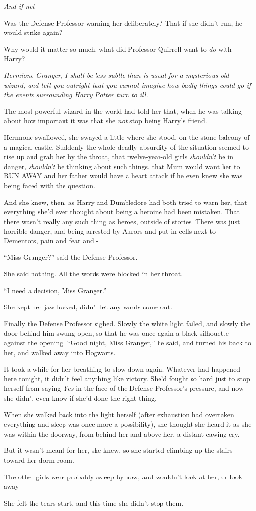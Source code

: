 \emph{And if not -}

Was the Defense Professor warning her deliberately? That if she didn't
run, he would strike again?

Why would it matter so much, what did Professor Quirrell want to
\emph{do} with Harry?

\emph{Hermione Granger, I shall be less subtle than is usual for a
mysterious old wizard, and tell you outright that you cannot}
\emph{imagine} \emph{how badly things could go if the events surrounding
Harry Potter turn to ill.}

The most powerful wizard in the world had told her that, when he was
talking about how important it was that she \emph{not} stop being
Harry's friend.

Hermione swallowed, she swayed a little where she stood, on the stone
balcony of a magical castle. Suddenly the whole deadly absurdity of the
situation seemed to rise up and grab her by the throat, that
twelve-year-old girls \emph{shouldn't} be in danger, \emph{shouldn't} be
thinking about such things, that Mum would want her to RUN AWAY and her
father would have a heart attack if he even knew she was being faced
with the question.

And she knew, then, as Harry and Dumbledore had both tried to warn her,
that everything she'd ever thought about being a heroine had been
mistaken. That there wasn't really any such thing as heroes, outside of
stories. There was just horrible danger, and being arrested by Aurors
and put in cells next to Dementors, pain and fear and -

``Miss Granger?'' said the Defense Professor.

She said nothing. All the words were blocked in her throat.

``I need a decision, Miss Granger.''

She kept her jaw locked, didn't let any words come out.

Finally the Defense Professor sighed. Slowly the white light failed, and
slowly the door behind him swung open, so that he was once again a black
silhouette against the opening. ``Good night, Miss Granger,'' he said,
and turned his back to her, and walked away into Hogwarts.

It took a while for her breathing to slow down again. Whatever had
happened here tonight, it didn't feel anything like victory. She'd
fought so hard just to stop herself from saying \emph{Yes} in the face
of the Defense Professor's pressure, and now she didn't even know if
she'd done the right thing.

When she walked back into the light herself (after exhaustion had
overtaken everything and sleep was once more a possibility), she thought
she heard it as she was within the doorway, from behind her and above
her, a distant cawing cry.

But it wasn't meant for her, she knew, so she started climbing up the
stairs toward her dorm room.

The other girls were probably asleep by now, and wouldn't look at her,
or look away -

She felt the tears start, and this time she didn't stop them.
